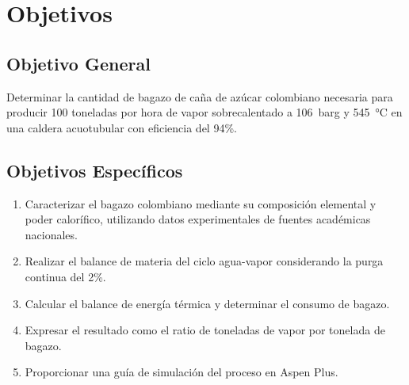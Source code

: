 \section{Objetivos}

\subsection{Objetivo General}
Determinar la cantidad de bagazo de caña de azúcar colombiano necesaria para producir 100 toneladas por hora de vapor sobrecalentado a \SI{106}{barg} y \SI{545}{\celsius} en una caldera acuotubular con eficiencia del 94\%.

\subsection{Objetivos Específicos}
\begin{enumerate}
	\item Caracterizar el bagazo colombiano mediante su composición elemental y poder calorífico, utilizando datos experimentales de fuentes académicas nacionales.
	\item Realizar el balance de materia del ciclo agua-vapor considerando la purga continua del 2\%.
	\item Calcular el balance de energía térmica y determinar el consumo de bagazo.
	\item Expresar el resultado como el ratio de toneladas de vapor por tonelada de bagazo.
	\item Proporcionar una guía de simulación del proceso en Aspen Plus.
\end{enumerate}
